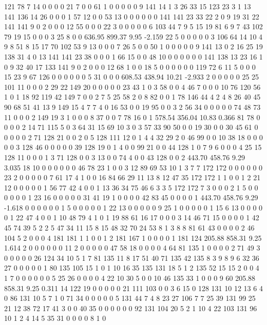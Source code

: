  121 78 7 14 0 0 0 0 21 7 0 0 61 1 0 0 0 0 0 9
 141 14 1 3 26 33 15 123 23 3 1 13 141 136 14 26 0 0 0 1
 57 12 0 0 53 13 0 0 0 0 0 0 141 141 23 33 22 2 0 9
 19 31 22 141 141 9 0 2 0 0 0 12 55 0 0 0 22 3 0 0
 0 0 0 6 103 44 7 9 5 15 19 81 6 9 7 43 102 79 19 15
 0 0 0 3 25 8 0 0
636.95 899.37 9.95 -2.159
 22 5 0 0 0 0 0 3 106 64 14 10 4 9 8 51 8 15 17 70
 102 53 9 13 0 0 0 7 26 5 0 0 50 1 0 0 0 0 0 9
 141 13 0 2 16 25 19 138 31 4 0 13 141 141 23 38 0 0 0 1
 66 15 0 0 48 10 0 0 0 0 0 0 141 138 13 23 16 1 0 9
 32 40 17 133 141 9 0 2 0 0 0 12 68 1 0 0 18 5 0 0
 0 0 0 0 119 72 6 11 5 0 0 0 15 23 9 67 126 0 0 0
 0 0 0 5 31 0 0 0
608.53 438.94 10.21 -2.933
 2 0 0 0 0 0 25 25 101 11 0 0 0 2 29 22 149 20 0 0
 0 0 0 23 43 1 0 3 58 0 0 4 46 7 0 0 0 10 76 120
 56 1 0 1 18 92 119 42 149 7 0 0 2 7 5 25 58 2 0 8
 82 0 0 1 78 146 44 4 2 4 8 26 40 45 90 68 51 41 13 9
 149 15 4 7 7 4 0 16 53 0 0 19 95 0 0 3 2 56 34 0
 0 0 0 0 74 48 73 11 0 0 0 2 149 19 3 1 0 0 0 8
 37 0 0 7 78 16 0 1
578.54 356.04 10.83 0.366
 81 78 0 0 0 0 2 14 71 115 5 0 3 64 31 15 69 10 3 0
 3 57 33 90 50 0 0 19 30 0 0 30 45 61 0 0 0 0 0 2
 71 128 21 0 0 2 0 5 128 111 12 0 1 4 4 32 29 2 0 46
 99 0 0 10 38 18 0 0 0 0 0 3 128 46 0 0 0 0 0 39
 128 19 0 1 4 0 0 99 21 0 0 44 128 1 0 7 9 6 0 0
 0 4 25 15 128 11 0 0 0 1 3 71 128 0 0 3 13 0 0 74
 4 0 0 43 128 0 0 2
443.70 458.76 9.29 3.035
 18 10 0 0 0 0 0 0 46 78 23 1 0 0 3 12 89 69 53 10
 1 3 7 7 172 172 0 0 0 0 0 0 23 2 0 0 0 0 0 7
 61 17 4 1 0 0 16 84 66 29 11 13 8 12 47 35 172 172 1 1
 0 0 1 2 21 12 0 0 0 0 0 1 56 77 42 4 0 0 1 13
 36 34 75 46 6 3 3 5 172 172 7 3 0 0 0 2 1 5 0 0
 0 0 0 0 1 23 16 0 0 0 0 0 31 41 19 1 0 0 0 0
 42 83 45 0 0 0 0 1
443.70 458.76 9.29 -1.618
 0 0 0 0 0 0 1 5 0 0 0 0 0 1 22 13 0 0 0 0
 0 9 25 1 0 0 0 0 0 1 15 6 13 0 0 0 0 0 1 22
 47 4 0 0 1 10 48 79 4 1 0 1 19 88 61 16 17 0 0 0
 3 14 46 71 15 0 0 0 0 1 42 45 74 39 5 2 2 5 47 34
 11 15 8 15 48 32 70 24 53 8 1 3 8 8 81 61 43 0 0 0
 0 2 46 104 5 2 0 0 0 4 181 181 1 1 0 0 1 2 181 167
 1 0 0 0 0 1 181 124
205.88 858.31 9.25 1.614
 2 0 0 0 0 0 0 11 2 0 0 0 0 0 47 58 18 0 0 0
 0 4 64 81 135 1 0 0 0 0 2 71 49 3 0 0 0 0 0 26
 124 34 10 5 1 7 81 135 11 8 17 51 40 71 135 42 135 8 3 9
 8 9 6 32 36 27 0 0 0 0 0 1 80 135 105 15 1 0 1 10
 16 35 135 131 18 5 1 2 135 52 15 15 2 0 0 4 1 7 0 0
 0 0 0 0 5 25 26 0 0 0 0 4 22 10 30 5 0 0 10 46
 135 33 1 0 0 0 9 60
205.88 858.31 9.25 0.311
 14 122 19 0 0 0 0 0 21 111 103 0 0 3 6 15 0 128 131 10
 12 13 6 4 0 86 131 10 5 7 1 0 71 34 0 0 0 0 0 5
 131 44 7 4 8 23 27 106 7 7 25 39 131 99 25 21 12 38 72 17
 41 3 0 0 40 35 0 0 0 0 0 0 92 131 104 20 5 2 1 10
 4 22 103 131 96 10 1 2 4 14 5 35 31 0 0 0 0 8 1 0

